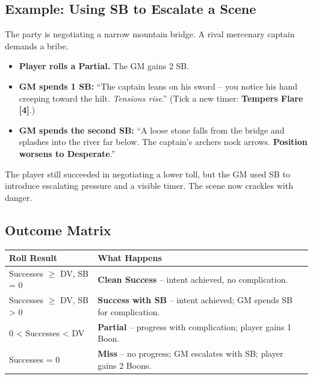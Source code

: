 \subsection{Example: Using SB to Escalate a Scene}
\label{subsec:bridge-sb-example}
\begin{tcolorbox}[colback=gray!5,colframe=gray!75!black,title={Spending SB for Drama (The Bridge)}, breakable]
The party is negotiating a narrow mountain bridge. A rival mercenary captain demands a bribe.

\begin{itemize}
  \item \textbf{Player rolls a Partial.} The GM gains 2 SB.
  \item \textbf{GM spends 1 SB:} ``The captain leans on his sword -- you notice his hand creeping toward the hilt. \emph{Tensions rise}.'' (Tick a new timer: \textbf{Tempers Flare [4]}.)
  \item \textbf{GM spends the second SB:} ``A loose stone falls from the bridge and splashes into the river far below. The captain's archers nock arrows. \textbf{Position worsens to Desperate}.''
\end{itemize}
The player still succeeded in negotiating a lower toll, but the GM used SB to introduce escalating pressure and a visible timer. The scene now crackles with danger.
\end{tcolorbox}

\subsection{Outcome Matrix}
\label{subsec:outcome-matrix}
\begin{tcolorbox}[title=Outcome Matrix, colback=white!97!gray, colframe=black!80!gray, breakable]
\begin{tabularx}{\linewidth}{lX}
\toprule
\textbf{Roll Result} & \textbf{What Happens} \\
\midrule
Successes $\geq$ DV, SB = 0 & \textbf{Clean Success} -- intent achieved, no complication. \\
Successes $\geq$ DV, SB > 0 & \textbf{Success with SB} -- intent achieved; GM spends SB for complication. \\
0 < Successes < DV & \textbf{Partial} -- progress with complication; player gains 1 Boon. \\
Successes = 0 & \textbf{Miss} -- no progress; GM escalates with SB; player gains 2 Boons. \\
\bottomrule
\end{tabularx}
\end{tcolorbox}

